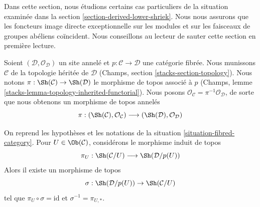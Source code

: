 \noindent
Dans cette section, nous étudions certains cas particuliers de la situation
examinée dans la section \ref{section-derived-lower-shriek}.
Nous nous assurons que les foncteurs image directe exceptionnelle sur les modules
et sur les faisceaux de groupes abéliens coïncident. Nous conseillons au lecteur de sauter
cette section en première lecture.

\begin{situation}
\label{situation-fibred-category}
Soient $(\mathcal{D}, \mathcal{O}_\mathcal{D})$ un site annelé
et $p : \mathcal{C} \to \mathcal{D}$ une catégorie fibrée. Nous munissons
$\mathcal{C}$ de la topologie héritée de $\mathcal{D}$
(Champs, section \ref{stacks-section-topology}). Nous notons
$\pi : \Sh(\mathcal{C}) \to \Sh(\mathcal{D})$ le morphisme de
topos associé à $p$
(Champs, lemme \ref{stacks-lemma-topology-inherited-functorial}).
Nous posons $\mathcal{O}_\mathcal{C} = \pi^{-1}\mathcal{O}_\mathcal{D}$,
de sorte que nous obtenons un morphisme de topos annelés
$$
\pi :
(\Sh(\mathcal{C}), \mathcal{O}_\mathcal{C})
\longrightarrow
(\Sh(\mathcal{D}), \mathcal{O}_\mathcal{D})
$$
\end{situation}

\begin{lemma}
\label{lemma-fibred-category-with-object}
On reprend les hypothèses et les notations de la situation \ref{situation-fibred-category}.
Pour $U \in \Ob(\mathcal{C})$, considérons le morphisme induit
de topos
$$
\pi_U : \Sh(\mathcal{C}/U) \longrightarrow \Sh(\mathcal{D}/p(U))
$$
Alors il existe un morphisme de topos
$$
\sigma : \Sh(\mathcal{D}/p(U)) \to \Sh(\mathcal{C}/U)
$$
tel que $\pi_U \circ \sigma = \text{id}$ et $\sigma^{-1} = \pi_{U, *}$.
\end{lemma}

